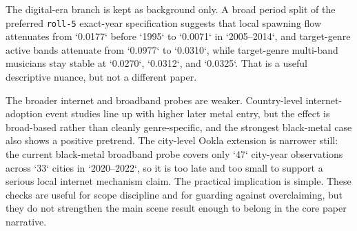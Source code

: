 The digital-era branch is kept as background only. A broad period split of the preferred
\texttt{roll-5} exact-year specification suggests that local spawning flow attenuates from
`0.0177` before `1995` to `0.0071` in `2005--2014`, and target-genre active bands attenuate from
`0.0977` to `0.0310`, while target-genre multi-band musicians stay stable at `0.0270`, `0.0312`,
and `0.0325`. That is a useful descriptive nuance, but not a different paper.

The broader internet and broadband probes are weaker. Country-level internet-adoption event studies
line up with higher later metal entry, but the effect is broad-based rather than cleanly
genre-specific, and the strongest black-metal case also shows a positive pretrend. The city-level
Ookla extension is narrower still: the current black-metal broadband probe covers only `47`
city-year observations across `33` cities in `2020--2022`, so it is too late and too small to
support a serious local internet mechanism claim. The practical implication is simple. These
checks are useful for scope discipline and for guarding against overclaiming, but they do not
strengthen the main scene result enough to belong in the core paper narrative.
